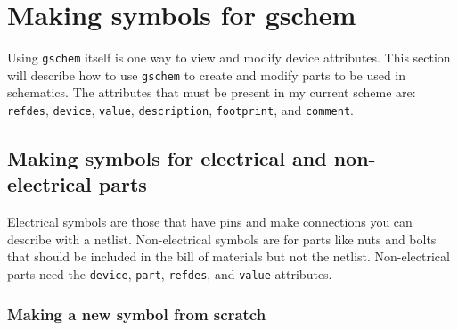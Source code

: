 \section{Making symbols for gschem}
Using \texttt{gschem} itself is one way to view and modify device attributes.  This section will describe how to use \texttt{gschem} to create and modify parts to be used in schematics. The attributes that must be present in my current scheme are: \texttt{refdes}, \texttt{device}, \texttt{value}, \texttt{description}, \texttt{footprint}, and \texttt{comment}.


\subsection{Making symbols for electrical and non-electrical parts}
Electrical symbols are those that have pins and make connections you can describe with a netlist.  Non-electrical symbols are for parts like nuts and bolts that should be included in the bill of materials but not the netlist.  Non-electrical parts need the \texttt{device}, \texttt{part}, \texttt{refdes}, and \texttt{value} attributes.

\subsubsection{Making a new symbol from scratch}

